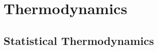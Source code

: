 %
%
%   

\chapter{Thermodynamics}\label{Chapter 2}

%
%
%
%

\section{Statistical Thermodynamics}\label{2.1}

%
%
